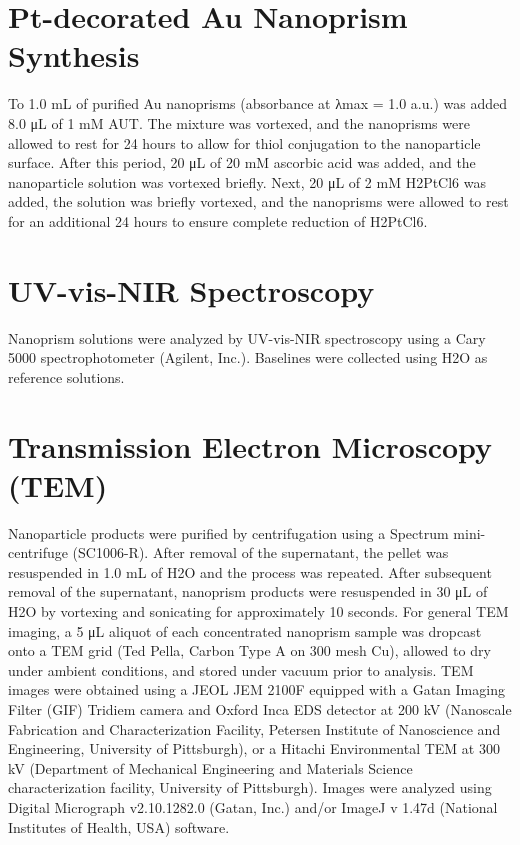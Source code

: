 \documentclass [11pt, proquest] {uwthesis}[2016/11/22]
\begin{document}
\section{Pt-decorated Au Nanoprism Synthesis}

To 1.0 mL of purified Au nanoprisms (absorbance at λmax = 1.0 a.u.) was added 8.0 μL of 1 mM AUT. The mixture was
vortexed, and the nanoprisms were allowed to rest for 24 hours to allow for thiol conjugation to the nanoparticle surface. After this period, 20 μL of 20 mM ascorbic acid was added, and the nanoparticle solution was vortexed briefly. Next, 20 μL of 2 mM H2PtCl6 was added, the solution was briefly vortexed, and the nanoprisms were allowed to rest for an additional 24 hours to ensure complete reduction of H2PtCl6. 

\section{UV-vis-NIR Spectroscopy}

Nanoprism solutions were analyzed by UV-vis-NIR spectroscopy using a Cary 5000 spectrophotometer (Agilent, Inc.). Baselines were collected using H2O as reference solutions.

\section{Transmission Electron Microscopy (TEM)}

Nanoparticle products were purified by centrifugation using a Spectrum mini-centrifuge (SC1006-R). After removal of the supernatant, the pellet was resuspended in 1.0 mL of H2O and the process was repeated. After subsequent removal of the supernatant, nanoprism products were resuspended in 30 μL of H2O by vortexing and sonicating for approximately 10 seconds. For general TEM imaging, a 5 μL aliquot of each concentrated nanoprism sample was dropcast onto a TEM grid (Ted Pella, Carbon Type A on 300 mesh Cu), allowed to dry under ambient conditions, and stored under vacuum prior to analysis. TEM images were obtained using a JEOL JEM 2100F equipped with a Gatan Imaging Filter (GIF) Tridiem camera and Oxford Inca EDS detector at 200 kV (Nanoscale Fabrication and Characterization Facility, Petersen Institute of Nanoscience and Engineering, University of Pittsburgh), or a Hitachi Environmental TEM at 300 kV (Department of Mechanical Engineering and Materials Science characterization facility, University of Pittsburgh). Images were analyzed using Digital Micrograph v2.10.1282.0 (Gatan, Inc.) and/or ImageJ v 1.47d (National Institutes of Health, USA) software.
\end{document}
